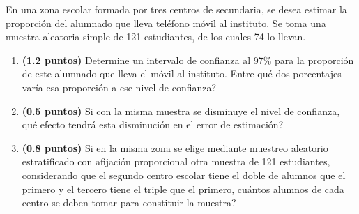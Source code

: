 
En una zona escolar formada por tres centros de secundaria, se desea estimar la proporción del alumnado que lleva teléfono móvil al instituto. Se toma una muestra aleatoria simple de 121 estudiantes, de los cuales 74 lo llevan.
\begin{enumerate}[label=\alph*)]
\item \textbf{(1.2 puntos)} Determine un intervalo de confianza al 97\% para la proporción de este alumnado que lleva el móvil al instituto. \textquestiondown{}Entre qué dos porcentajes varía esa proporción a ese nivel de confianza?
\item \textbf{(0.5 puntos)} Si con la misma muestra se disminuye el nivel de confianza, \textquestiondown{}qué efecto tendrá esta disminución en el error de estimación?
\item \textbf{(0.8 puntos)} Si en la misma zona se elige mediante muestreo aleatorio estratificado con afijación proporcional otra muestra de 121 estudiantes, considerando que el segundo centro escolar tiene el doble de alumnos que el primero y el tercero tiene el triple que el primero, \textquestiondown{}cuántos alumnos de cada centro se deben tomar para constituir la muestra?
\end{enumerate}
